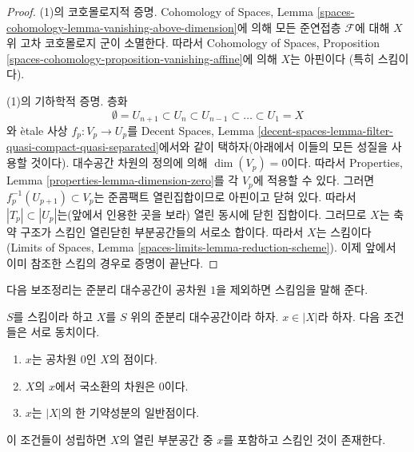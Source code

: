 \begin{proof}
\medskip\noindent
(1)의 코호몰로지적 증명. Cohomology of Spaces, Lemma
\ref{spaces-cohomology-lemma-vanishing-above-dimension}에 의해 모든 준연접층
$\mathcal{F}$에 대해 $X$ 위 고차 코호몰로지 군이 소멸한다. 따라서
Cohomology of Spaces, Proposition
\ref{spaces-cohomology-proposition-vanishing-affine}에 의해 $X$는 아핀이다
(특히 스킴이다).

\medskip\noindent
(1)의 기하학적 증명. 층화
$$
\emptyset = U_{n + 1} \subset
U_n \subset U_{n - 1} \subset \ldots \subset U_1 = X
$$
와 \`etale 사상 $f_p : V_p \to U_p$를 Decent Spaces, Lemma
\ref{decent-spaces-lemma-filter-quasi-compact-quasi-separated}에서와 같이
택하자(아래에서 이들의 모든 성질을 사용할 것이다). 대수공간 차원의
정의에 의해 $\dim(V_p) = 0$이다. 따라서 Properties, Lemma
\ref{properties-lemma-dimension-zero}를 각 $V_p$에 적용할 수 있다.
그러면 $f_p^{-1}(U_{p + 1}) \subset V_p$는 준콤팩트 열린집합이므로
아핀이고 닫혀 있다. 따라서 $|T_p| \subset |U_p|$는(앞에서 인용한
곳을 보라) 열린 동시에 닫힌 집합이다. 그러므로 $X$는 축약 구조가
스킴인 열린닫힌 부분공간들의 서로소 합이다. 따라서 $X$는 스킴이다
(Limits of Spaces, Lemma \ref{spaces-limits-lemma-reduction-scheme}). 이제
앞에서 이미 참조한 스킴의 경우로 증명이 끝난다.
\end{proof}

\noindent
다음 보조정리는 준분리 대수공간이 공차원 $1$을 제외하면 스킴임을
말해 준다.

\begin{lemma}
\label{lemma-generic-point-in-schematic-locus}
$S$를 스킴이라 하고 $X$를 $S$ 위의 준분리 대수공간이라 하자.
$x \in |X|$라 하자. 다음 조건들은 서로 동치이다.
\begin{enumerate}
\item $x$는 공차원 $0$인 $X$의 점이다.
\item $X$의 $x$에서 국소환의 차원은 $0$이다.
\item $x$는 $|X|$의 한 기약성분의 일반점이다.
\end{enumerate}
이 조건들이 성립하면 $X$의 열린 부분공간 중 $x$를 포함하고 스킴인
것이 존재한다.
\end{lemma}

